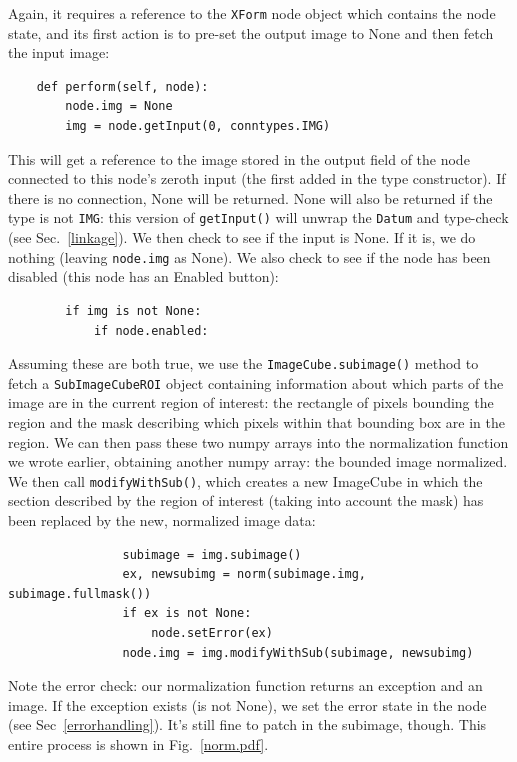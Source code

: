 Again, it requires a reference to the
\texttt{XForm} node object which contains the node state, and its first action
is to pre-set the output image to None and then fetch the input image:
\begin{lstlisting}
    def perform(self, node):
        node.img = None    
        img = node.getInput(0, conntypes.IMG)
\end{lstlisting}
This will get a reference to the image stored in the output field of the node
connected to this node's zeroth input (the first added in the type
constructor). If there is no connection, None will be returned. None will also
be returned if the type is not \texttt{IMG}: this version of \texttt{getInput()} will
unwrap the \texttt{Datum} and type-check (see Sec.~\ref{linkage}). We then check to see if the input
is None. If it is, we do nothing (leaving \texttt{node.img} as None). We also
check to see if the node has been disabled (this node has an Enabled button):
\begin{lstlisting}
        if img is not None:
            if node.enabled:
\end{lstlisting}
Assuming these are both true, we use the \texttt{ImageCube.subimage()} method to fetch
a \texttt{SubImageCubeROI} object containing information about which parts of the image are
in the current region of interest: the rectangle of pixels bounding the region and the mask
describing which pixels within that bounding box are in the region. We can then pass these two numpy
arrays into the normalization function we wrote earlier, obtaining another numpy array: the 
bounded image normalized. We then call \texttt{modifyWithSub()}, which creates a new ImageCube
in which the section described by the region of interest (taking into account the mask)
has been replaced by the new, normalized image data:
\begin{lstlisting}
                subimage = img.subimage()
                ex, newsubimg = norm(subimage.img, subimage.fullmask())
                if ex is not None:
                    node.setError(ex)
                node.img = img.modifyWithSub(subimage, newsubimg)
\end{lstlisting}
Note the error check: our normalization function returns an exception and an
image. If the exception exists (is not None), we set the error state in the
node (see Sec~\ref{errorhandling}). It's still fine to patch in the subimage,
though. This entire process is shown in Fig.~\ref{norm.pdf}.

